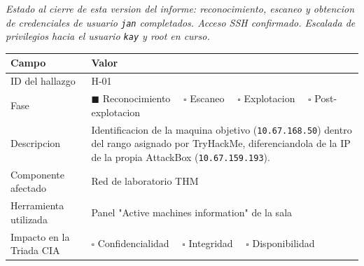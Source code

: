 \documentclass[11pt,a4paper]{article}
\begin{document}
\textit{Estado al cierre de esta version del informe: reconocimiento, escaneo y obtencion de credenciales de usuario \texttt{jan} completados. Acceso SSH confirmado. Escalada de privilegios hacia el usuario \texttt{kay} y root en curso.}

\renewcommand{\arraystretch}{1.5}
\begin{longtable}{@{} p{3.5cm} p{10cm} @{}}

\toprule
\textbf{Campo} & \textbf{Valor} \\
\midrule
ID del hallazgo & H-01 \\
\midrule
Fase & $\blacksquare$ Reconocimiento $\quad\square$ Escaneo $\quad\square$ Explotacion $\quad\square$ Post-explotacion \\
\midrule
Descripcion & Identificacion de la maquina objetivo (\texttt{10.67.168.50}) dentro del rango asignado por TryHackMe, diferenciandola de la IP de la propia AttackBox (\texttt{10.67.159.193}). \\
\midrule
Componente afectado & Red de laboratorio THM \\
\midrule
Herramienta utilizada & Panel "Active machines information" de la sala \\
\midrule
Impacto en la Triada CIA & $\square$ Confidencialidad $\quad\square$ Integridad $\quad\square$ Disponibilidad \\
\bottomrule
\end{longtable}
\end{document}
